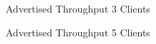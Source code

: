 \documentclass[10pt,sigconf]{acmart}
\begin{document}
\begin{figure}
  \centering
  \caption{Advertised Throughput 3 Clients}
  \label{fig:throughput-safe-clients-3-app}
\end{figure}

\begin{figure}
  \centering
  \caption{Advertised Throughput 5 Clients}
  \label{fig:throughput-safe-clients-5-app}
\end{figure}


\end{document}
